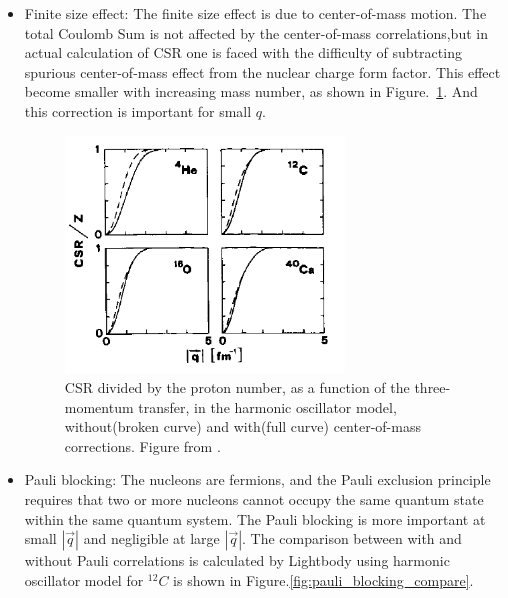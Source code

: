 \begin{itemize}
\item Finite size effect:  
The finite size effect is due to center-of-mass motion. The total Coulomb Sum is not affected by the center-of-mass
correlations,but in actual calculation of CSR one is faced with the difficulty of subtracting spurious center-of-mass 
effect from the nuclear charge form factor.
This effect become smaller with increasing mass number, as shown in Figure.~\ref{fig:finite_size_data}. And this correction is important for
small $q$. 

\begin{figure}[h]
\centering
\includegraphics[width=0.7\textwidth]{figs/finite_size_data.png}
\caption[finite size data]{CSR divided by the proton number, as a function of the three-momentum transfer, in the
harmonic oscillator model, without(broken curve) and with(full curve) center-of-mass corrections. Figure from
\cite{Orlandini1991}.  \label{fig:finite_size_data}}
\end{figure}


\item Pauli blocking: The nucleons are fermions, and the Pauli exclusion principle requires that two or more nucleons
cannot occupy the same quantum state within the same quantum system. 
The Pauli blocking is more important at small $|\vec{q}|$ and negligible at large $|\vec{q}|$. The comparison between
with and without Pauli correlations is calculated by Lightbody using harmonic oscillator model for $^{12}C$ is shown
in Figure.\ref{fig:pauli_blocking_compare}.


\end{itemize}
